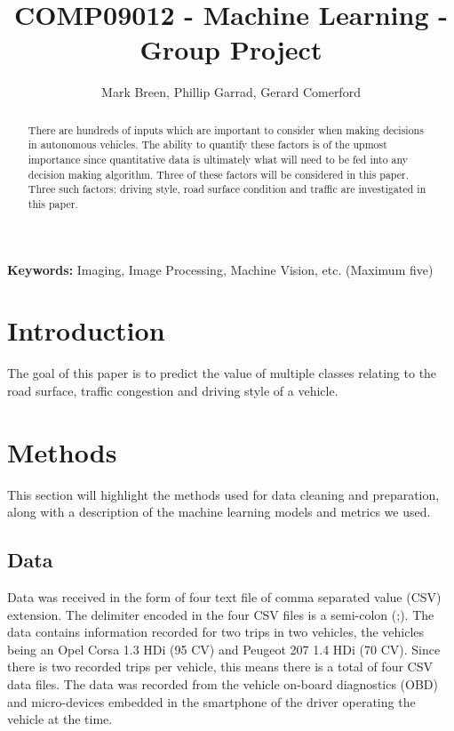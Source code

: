 \documentclass[a4paper,11pt]{article}
\begin{document}
\title{COMP09012 - Machine Learning - Group Project}

\author{Mark Breen, Phillip Garrad, Gerard Comerford}
\date{}
\maketitle
\thispagestyle{empty}



\begin{abstract}
There are hundreds of inputs which are important to consider when making decisions in autonomous vehicles. The ability to quantify these factors is of the upmost importance since quantitative data is ultimately what will need to be fed into any decision making algorithm. Three of these factors will be considered in this paper. Three such factors: driving style, road surface condition and traffic are investigated in this paper.
\end{abstract}
\textbf{Keywords:} Imaging, Image Processing, Machine Vision, etc. (Maximum five)



\section{Introduction}

The goal of this paper is to predict the value of multiple classes relating to the road surface, traffic congestion and driving style of a vehicle.


\section{Methods}

This section will highlight the methods used for data cleaning and preparation, along with a description of the machine learning models and metrics we used.

\subsection{Data}

Data was received in the form of four text file of comma separated value (CSV) extension. The delimiter encoded in the four CSV files is a semi-colon (;). The data contains information recorded for two trips in two vehicles, the vehicles being an Opel Corsa 1.3 HDi (95 CV) and Peugeot 207 1.4 HDi (70 CV). Since there is two recorded trips per vehicle, this means there is a total of four CSV data files. The data was recorded from the vehicle on-board diagnostics (OBD) and micro-devices embedded in the smartphone of the driver operating the vehicle at the time.
\end{document}
